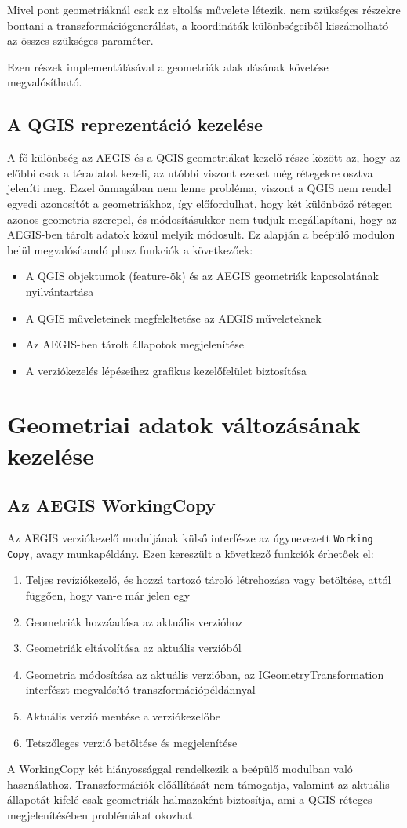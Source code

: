 Mivel pont geometriáknál csak az eltolás művelete létezik, nem szükséges részekre bontani a transzformációgenerálást, a koordináták különbségeiből kiszámolható az összes szükséges paraméter.

Ezen részek implementálásával a geometriák alakulásának követése megvalósítható.

\subsection{A QGIS reprezentáció kezelése}
A fő különbség az AEGIS és a QGIS geometriákat kezelő része között az, hogy az előbbi csak a téradatot kezeli, az utóbbi viszont ezeket még rétegekre osztva jeleníti meg. Ezzel önmagában nem lenne probléma, viszont a QGIS nem rendel egyedi azonosítót a geometriákhoz, így előfordulhat, hogy két különböző rétegen azonos geometria szerepel, és módosításukkor nem tudjuk megállapítani, hogy az AEGIS-ben tárolt adatok közül melyik módosult. Ez alapján  a beépülő modulon belül megvalósítandó plusz funkciók a következőek:
\begin{itemize}
	\item A QGIS objektumok (feature-ök) és az AEGIS geometriák kapcsolatának nyilvántartása
	\item A QGIS műveleteinek megfeleltetése az AEGIS műveleteknek
	\item Az AEGIS-ben tárolt állapotok megjelenítése 
	\item A verziókezelés lépéseihez grafikus kezelőfelület biztosítása
\end{itemize}

\section{Geometriai adatok változásának kezelése}
\subsection{Az AEGIS WorkingCopy}
Az AEGIS verziókezelő moduljának külső interfésze az úgynevezett \texttt{Working Copy}, avagy munkapéldány. Ezen kereszült a következő funkciók érhetőek el:
\begin{enumerate}
	\item Teljes revíziókezelő, és hozzá tartozó tároló létrehozása vagy betöltése, attól függően, hogy van-e már jelen egy
	\item Geometriák hozzáadása az aktuális verzióhoz
	\item Geometriák eltávolítása az aktuális verzióból
	\item Geometria módosítása az aktuális verzióban, az IGeometryTransformation interfészt megvalósító transzformációpéldánnyal
	\item Aktuális verzió mentése a verziókezelőbe
	\item Tetszőleges verzió betöltése és megjelenítése
\end{enumerate}
A WorkingCopy két hiányossággal rendelkezik a beépülő modulban való használathoz. Transzformációk előállítását nem támogatja, valamint az aktuális állapotát kifelé csak geometriák halmazaként biztosítja, ami a QGIS réteges megjelenítésében problémákat okozhat.
